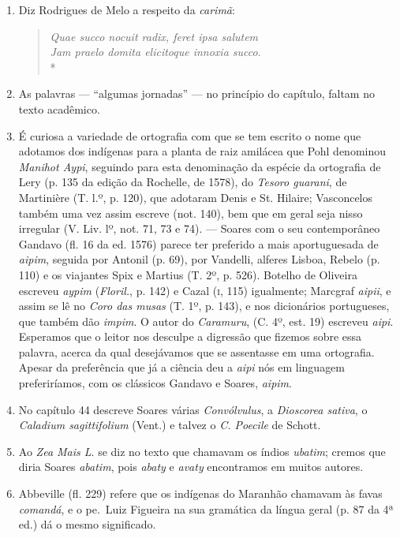 \begin{enumerate}
\item  Diz Rodrigues de Melo a respeito da \textit{carimã}:
\begin{verse}
\textit{Quae succo nocuit radix, feret ipsa salutem\\
Jam praelo domita elicitoque innoxia succo}. \\*
\end{verse}


\item As palavras --- ``algumas jornadas'' --- no princípio do capítulo, faltam no texto 
acadêmico.

\item É curiosa a variedade de ortografia com que se tem escrito o nome que adotamos 
dos indígenas para a planta de raiz amilácea que Pohl denominou \textit{Manihot Aypi}, 
seguindo para esta denominação da espécie da ortografia de Lery (p. 135 da edição da 
Rochelle, de 1578), do \textit{Tesoro guarani}, de Martinière (T. l.º, p. 120), que adotaram 
Denis e St. Hilaire; Vasconcelos também uma vez assim escreve (not. 140), bem que em 
geral seja nisso irregular (V. Liv. lº, not. 71, 73 e 74). --- Soares com o seu contemporâneo 
Gandavo (fl. 16 da ed. 1576) parece ter preferido a mais aportuguesada de \textit{aipim}, 
seguida por Antonil (p. 69), por Vandelli, alferes Lisboa, Rebelo (p. 110) e os viajantes 
Spix e Martius (T. 2º, p. 526). Botelho de Oliveira escreveu \textit{aypim} (\textit{Floril.}, p. 142) e 
Cazal (\textsc{i}, 115) igualmente; Marcgraf \textit{aipii}, e assim se lê no \textit{Coro das musas} (T. 1º, p. 
143), e nos dicionários portugueses, que também dão \textit{impim}. O autor do \textit{Caramuru}, (C. 
4º, est. 19) escreveu \textit{aipi}.
Esperamos que o leitor nos desculpe a digressão que fizemos sobre essa palavra, acerca 
da qual desejávamos que se assentasse em uma ortografia. Apesar da preferência que já a 
ciência deu a \textit{aipi} nós em linguagem preferiríamos, com os clássicos Gandavo e Soares, \textit{aipim}.

\item No capítulo 44 descreve Soares várias \textit{Convólvulus}, a \textit{Dioscorea sativa}, 
o \textit{Caladium sagittifolium} (Vent.) e talvez o \textit{C. Poecile} de Schott.

\item Ao \textit{Zea Mais L}. se diz no texto que chamavam os índios \textit{ubatim}; cremos que diria 
Soares \textit{abatim}, pois \textit{abaty} e \textit{avaty} encontramos em muitos autores.

\item Abbeville (fl. 229) refere que os indígenas do Maranhão chamavam às favas \textit{comandá}, 
e o pe.~Luiz Figueira na sua gramática da língua geral (p. 87 da 4ª ed.) dá o 
mesmo significado.


\end{enumerate}
